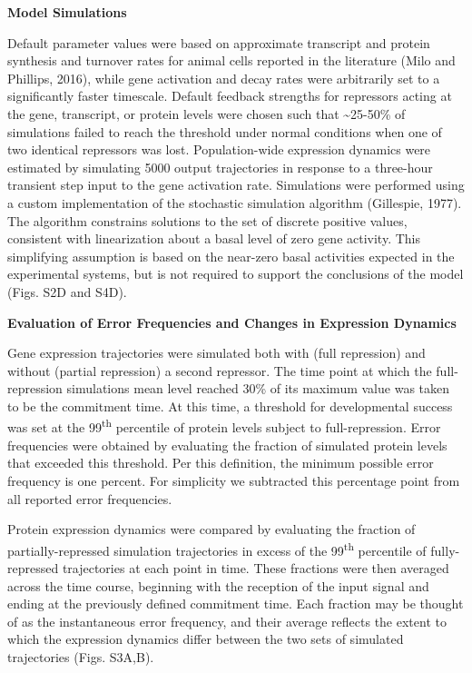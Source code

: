 \textbf{Model Simulations}

Default parameter values were based on approximate transcript and protein synthesis and turnover rates for animal cells reported in the literature (Milo and Phillips, 2016), while gene activation and decay rates were arbitrarily set to a significantly faster timescale. Default feedback strengths for repressors acting at the gene, transcript, or protein levels were chosen such that \textasciitilde{}25-50\% of simulations failed to reach the threshold under normal conditions when one of two identical repressors was lost. Population-wide expression dynamics were estimated by simulating 5000 output trajectories in response to a three-hour transient step input to the gene activation rate. Simulations were performed using a custom implementation of the stochastic simulation algorithm (Gillespie, 1977). The algorithm constrains solutions to the set of discrete positive values, consistent with linearization about a basal level of zero gene activity. This simplifying assumption is based on the near-zero basal activities expected in the experimental systems, but is not required to support the conclusions of the model (Figs. S2D and S4D).

\textbf{Evaluation of Error Frequencies and Changes in Expression Dynamics }

Gene expression trajectories were simulated both with (full repression) and without (partial repression) a second repressor. The time point at which the full-repression simulations mean level reached 30\% of its maximum value was taken to be the commitment time. At this time, a threshold for developmental success was set at the 99\textsuperscript{th} percentile of protein levels subject to full-repression. Error frequencies were obtained by evaluating the fraction of simulated protein levels that exceeded this threshold. Per this definition, the minimum possible error frequency is one percent. For simplicity we subtracted this percentage point from all reported error frequencies.

Protein expression dynamics were compared by evaluating the fraction of partially-repressed simulation trajectories in excess of the 99\textsuperscript{th} percentile of fully-repressed trajectories at each point in time. These fractions were then averaged across the time course, beginning with the reception of the input signal and ending at the previously defined commitment time. Each fraction may be thought of as the instantaneous error frequency, and their average reflects the extent to which the expression dynamics differ between the two sets of simulated trajectories (Figs. S3A,B).

